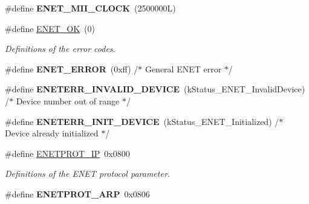\begin{DoxyCompactItemize}
\item 
\#define {\bfseries E\+N\+E\+T\+\_\+\+M\+I\+I\+\_\+\+C\+L\+O\+CK}~(2500000\+L)\hypertarget{group__enet__rtcs__adaptor_gacb8fd2cb7075f72e03c4d3fd8fc707fe}{}\label{group__enet__rtcs__adaptor_gacb8fd2cb7075f72e03c4d3fd8fc707fe}

\item 
\#define \hyperlink{group__enet__rtcs__adaptor_ga85560f49c84a1f3617a7a6102093fedf}{E\+N\+E\+T\+\_\+\+OK}~(0)\hypertarget{group__enet__rtcs__adaptor_ga85560f49c84a1f3617a7a6102093fedf}{}\label{group__enet__rtcs__adaptor_ga85560f49c84a1f3617a7a6102093fedf}

\begin{DoxyCompactList}\small\item\em Definitions of the error codes. \end{DoxyCompactList}\item 
\#define {\bfseries E\+N\+E\+T\+\_\+\+E\+R\+R\+OR}~(0xff)  /$\ast$ General E\+N\+E\+T error $\ast$/\hypertarget{group__enet__rtcs__adaptor_gab24aa510b4c1d823fdfb791a5bb0a436}{}\label{group__enet__rtcs__adaptor_gab24aa510b4c1d823fdfb791a5bb0a436}

\item 
\#define {\bfseries E\+N\+E\+T\+E\+R\+R\+\_\+\+I\+N\+V\+A\+L\+I\+D\+\_\+\+D\+E\+V\+I\+CE}~(k\+Status\+\_\+\+E\+N\+E\+T\+\_\+\+Invalid\+Device)   /$\ast$ Device number out of range  $\ast$/\hypertarget{group__enet__rtcs__adaptor_ga6238f4f888b935c16c220b153c732106}{}\label{group__enet__rtcs__adaptor_ga6238f4f888b935c16c220b153c732106}

\item 
\#define {\bfseries E\+N\+E\+T\+E\+R\+R\+\_\+\+I\+N\+I\+T\+\_\+\+D\+E\+V\+I\+CE}~(k\+Status\+\_\+\+E\+N\+E\+T\+\_\+\+Initialized)   /$\ast$ Device already initialized  $\ast$/\hypertarget{group__enet__rtcs__adaptor_gae503c4bf9819dd08d2611ad25b4ed6d9}{}\label{group__enet__rtcs__adaptor_gae503c4bf9819dd08d2611ad25b4ed6d9}

\item 
\#define \hyperlink{group__enet__rtcs__adaptor_gac69f110cab5bede2d09a9e66f726393a}{E\+N\+E\+T\+P\+R\+O\+T\+\_\+\+IP}~0x0800\hypertarget{group__enet__rtcs__adaptor_gac69f110cab5bede2d09a9e66f726393a}{}\label{group__enet__rtcs__adaptor_gac69f110cab5bede2d09a9e66f726393a}

\begin{DoxyCompactList}\small\item\em Definitions of the E\+N\+ET protocol parameter. \end{DoxyCompactList}\item 
\#define {\bfseries E\+N\+E\+T\+P\+R\+O\+T\+\_\+\+A\+RP}~0x0806\hypertarget{group__enet__rtcs__adaptor_ga726a48f928103ff296d9abd8de12a405}{}\label{group__enet__rtcs__adaptor_ga726a48f928103ff296d9abd8de12a405}


\end{DoxyCompactItemize}
